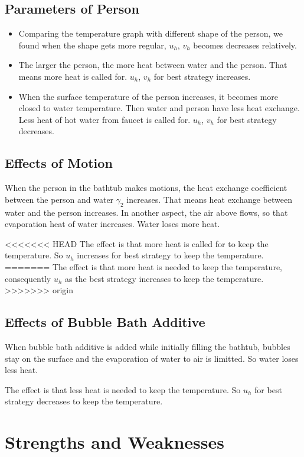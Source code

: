 \documentclass[12pt,a4paper,titlepage]{article}
\begin{document}
\subsection{Parameters of Person}
\label{sec:parameters of person}
\begin{itemize}
\item Comparing the temperature graph with different shape of the person, we found when the shape gets more regular, $u_h$, $v_h$ becomes decreases relatively.
\item The larger the person, the more heat between water and the person. That means more heat is called for. $u_h$, $v_h$ for best strategy increases.
\item When the surface temperature of the person increases, it becomes more closed to water temperature. Then water and person have less heat exchange. Less heat of hot water from faucet is called for. $u_h$, $v_h$ for best strategy decreases.
\end{itemize}

\subsection{Effects of Motion}
\label{sec:effects of motion}
When the person in the bathtub makes motions, the heat exchange coefficient between the person and water ${\gamma}_2$ increases. That means heat exchange between water and the person increases. In another aspect, the air above flows, so that evaporation heat of water increases. Water loses more heat.

<<<<<<< HEAD
The effect is that more heat is called for to keep the temperature. So $u_h$ increases for best strategy to keep the temperature.
=======
The effect is that more heat is needed to keep the temperature, consequently $u_h$ as the best strategy increases to keep the temperature. 
>>>>>>> origin

\subsection{Effects of Bubble Bath Additive}
\label{sec:effects of bubble bath additive}
When bubble bath additive is added while initially filling the bathtub, bubbles stay on the surface and the evaporation of water to air is limitted. So water loses less heat.

The effect is that less heat is needed to keep the temperature. So $u_h$ for best strategy decreases to keep the temperature.

\section{Strengths and Weaknesses}
\label{sec:strengths-and-weaknesses}
\end{document}
